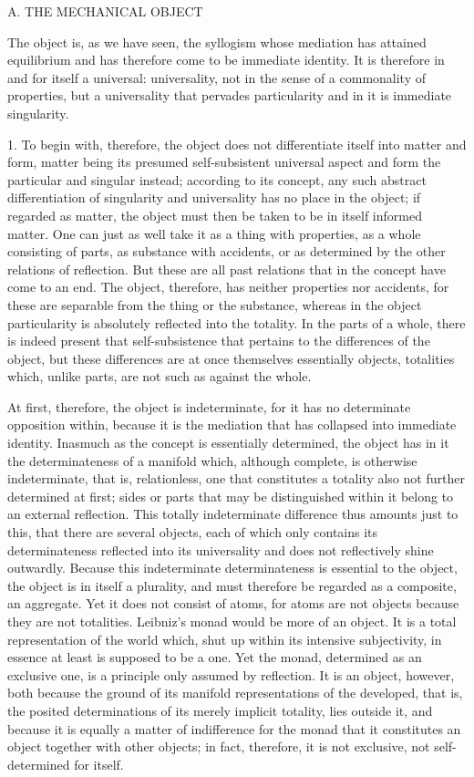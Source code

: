 A. THE MECHANICAL OBJECT

The object is, as we have seen, the syllogism
whose mediation has attained equilibrium
and has therefore come to be immediate identity.
It is therefore in and for itself a universal: universality,
not in the sense of a commonality of properties,
but a universality that pervades particularity
and in it is immediate singularity.

1. To begin with, therefore,
the object does not differentiate
itself into matter and form,
matter being its presumed self-subsistent universal aspect
and form the particular and singular instead;
according to its concept, any such abstract differentiation of
singularity and universality has no place in the object;
if regarded as matter, the object must then be taken
to be in itself informed matter.
One can just as well take it as a thing with properties,
as a whole consisting of parts, as substance with accidents,
or as determined by the other relations of reflection.
But these are all past relations that
in the concept have come to an end.
The object, therefore, has neither properties nor accidents,
for these are separable from the thing or the substance,
whereas in the object particularity is
absolutely reflected into the totality.
In the parts of a whole,
there is indeed present that self-subsistence that
pertains to the differences of the object,
but these differences are at once themselves essentially objects,
totalities which, unlike parts, are not such as against the whole.

At first, therefore, the object is indeterminate,
for it has no determinate opposition within,
because it is the mediation
that has collapsed into immediate identity.
Inasmuch as the concept is essentially determined,
the object has in it the determinateness of a manifold
which, although complete, is otherwise
indeterminate, that is, relationless,
one that constitutes a totality
also not further determined at first;
sides or parts that may be distinguished
within it belong to an external reflection.
This totally indeterminate difference thus amounts just to this,
that there are several objects,
each of which only contains its determinateness
reflected into its universality
and does not reflectively shine outwardly.
Because this indeterminate determinateness is
essential to the object,
the object is in itself a plurality,
and must therefore be regarded as a composite, an aggregate.
Yet it does not consist of atoms, for atoms are not objects
because they are not totalities.
Leibniz's monad would be more of an object.
It is a total representation of the world
which, shut up within its intensive subjectivity,
in essence at least is supposed to be a one.
Yet the monad, determined as an exclusive one,
is a principle only assumed by reflection.
It is an object, however, both because
the ground of its manifold representations of the developed,
that is, the posited determinations of
its merely implicit totality, lies outside it,
and because it is equally a matter of indifference
for the monad that it constitutes an object
together with other objects;
in fact, therefore, it is not exclusive,
not self-determined for itself.

